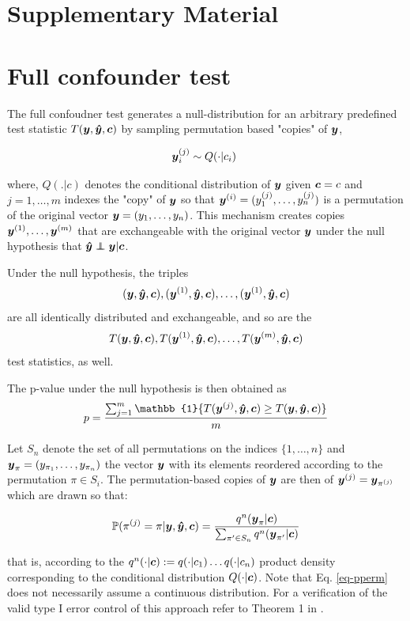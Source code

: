 \section{Supplementary Material}
\beginsupplement

\section{Full confounder test}
\label{sup:full-test}

The full confoudner test generates a null-distribution for an arbitrary predefined test statistic $T(\boldsymbol{y},\boldsymbol{\hat{y}},\boldsymbol{c})$ by sampling permutation based "copies" of $\boldsymbol{y}$,

$$\y_i^{(j)} \sim Q(\cdot|c_i) \ $$

where, $Q(.|c)$ denotes the conditional distribution of $\boldsymbol{y}$ given $\boldsymbol{c}=c$ and $j=1,\dots, m$ indexes the "copy" of $\boldsymbol{y}$ so that $\boldsymbol{y}^{(i)} = (y_1^{(j)}, \dots, y_n^{(j)})$ is a permutation of the original vector $\boldsymbol{y} = (y_1, \dots, y_n)$. This mechanism creates copies $\boldsymbol{y}^{(1)}, \dots ,\boldsymbol{y}^{(m)}$ that are exchangeable with the original vector $\boldsymbol{y}$ under the null hypothesis that $\yhat \independent \y | \c$.

Under the null hypothesis, the triples $$(\boldsymbol{y},\boldsymbol{\hat{y}},\boldsymbol{c}), (\boldsymbol{y}^{(1)}, \boldsymbol{\hat{y}}, \boldsymbol{c}),\dots, (\boldsymbol{y}^{(1)}, \boldsymbol{\hat{y}}, \boldsymbol{c})$$ are all identically distributed and exchangeable, and so are the 
$$T(\boldsymbol{y},\boldsymbol{\hat{y}},\boldsymbol{c}), T(\boldsymbol{y}^{(1)}, \boldsymbol{\hat{y}}, \boldsymbol{c}),\dots,T(\boldsymbol{y}^{(m)}, \boldsymbol{\hat{y}}, \boldsymbol{c})$$
test statistics, as well.

The p-value under the null hypothesis is then obtained as
$$ p= \frac{\sum_{j=1}^m \mathbb{1} \{T(\y^{(j)}, \yhat, \c) \geq T(\y, \yhat, \c) \}  }{m}$$

Let $S_n$ denote the set of all permutations on the indices $\{1,\dots,n\}$ and $\boldsymbol{y}_\pi = (y_{\pi_1}, \dots, y_{\pi_n})$ the vector $\boldsymbol{y}$ with its elements reordered according to the permutation $\pi \in S_i$.
The permutation-based copies of $\boldsymbol{y}$ are then of $\boldsymbol{y}^{(j)} = \boldsymbol{y}_{\pi^{(j)}}$ which are drawn so that:

\begin{equation}
    \mathbb{P}(\pi^{(j)} = \pi | \boldsymbol{y},\boldsymbol{\hat{y}},\boldsymbol{c}) = \frac{q^n(\boldsymbol{y}_\pi | \boldsymbol{c})}{\sum_{\pi' \in S_n} q^n(\boldsymbol{y}_{\pi'} | \boldsymbol{c})}
    \label{eq-pperm}
\end{equation}

that is, according to the $q^n(\cdot|\boldsymbol{c}) := q(\cdot | c_1) \dots q(\cdot|c_n)$ product density corresponding to the conditional distribution $Q(\cdot|\boldsymbol{c})$. Note that Eq. \ref{eq-pperm} does not necessarily assume a continuous distribution.
For a verification of the valid type I error control of this approach refer to Theorem 1 in \citep{berrett2020conditional}.

